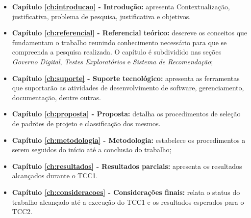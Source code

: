 \begin{itemize}
    \item \textbf{Capítulo \ref{ch:introducao} - Introdução:} apresenta Contextualização, justificativa, problema de pesquisa, justificativa e objetivos.
    \item \textbf{Capítulo \ref{ch:referencial} - Referencial teórico:} descreve os conceitos que fundamentam o trabalho reunindo conhecimento necessário para que se compreenda a pesquisa realizada. O capítulo é subdividido nas seções \textit{Governo Digital}, \textit{Testes Exploratórios} e \textit{Sistema de Recomendação};
    \item \textbf{Capítulo \ref{ch:suporte} - Suporte tecnológico:} apresenta as ferramentas que suportarão as atividades de desenvolvimento de software, gerenciamento, documentação, dentre outras.
    \item \textbf{Capítulo \ref{ch:proposta} - Proposta:} detalha os procedimentos de seleção de padrões de projeto e classificação dos mesmos.
    \item \textbf{Capítulo \ref{ch:metodologia} - Metodologia:} estabelece os procedimentos a serem seguidos do início até a conclusão do trabalho;
    \item \textbf{Capítulo \ref{ch:resultados} - Resultados parciais:} apresenta os resultados alcançados durante o TCC1.
    \item \textbf{Capítulo \ref{ch:consideracoes} - Considerações finais:} relata o status do trabalho alcançado até a execução do TCC1 e os resultados esperados para o TCC2.
\end{itemize}